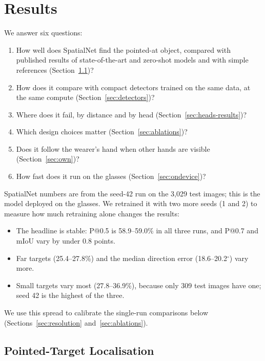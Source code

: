 \section{Results}\label{sec:results}

We answer six questions:
\begin{enumerate}
\item How well does SpatialNet find the pointed-at object, compared with published results of state-of-the-art and zero-shot models and with simple references (Section~\ref{sec:main})?
\item How does it compare with compact detectors trained on the same data, at the same compute (Section~\ref{sec:detectors})?
\item Where does it fail, by distance and by head (Section~\ref{sec:heads-results})?
\item Which design choices matter (Section~\ref{sec:ablations})?
\item Does it follow the wearer's hand when other hands are visible (Section~\ref{sec:own})?
\item How fast does it run on the glasses (Section~\ref{sec:ondevice})?
\end{enumerate}
SpatialNet numbers are from the seed-42 run on the 3,029 test images; this is the model deployed on the glasses. We retrained it with two more seeds (1 and 2) to measure how much retraining alone changes the results:
\begin{itemize}
\item The headline is stable: P@0.5 is 58.9--59.0\% in all three runs, and P@0.7 and mIoU vary by under 0.8 points.
\item Far targets (25.4--27.8\%) and the median direction error (18.6--20.2$^\circ$) vary more.
\item Small targets vary most (27.8--36.9\%), because only 309 test images have one; seed 42 is the highest of the three.
\end{itemize}
We use this spread to calibrate the single-run comparisons below (Sections~\ref{sec:resolution} and~\ref{sec:ablations}).

\subsection{Pointed-Target Localisation}\label{sec:main}

